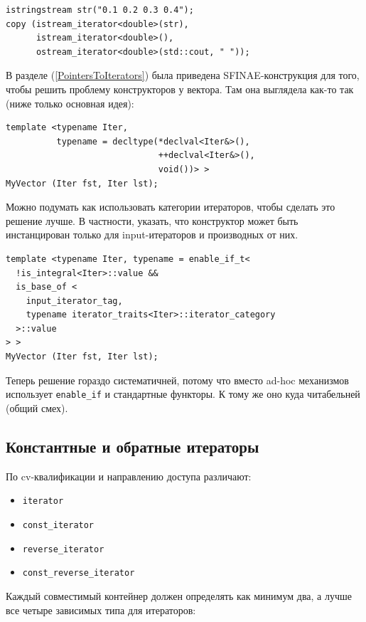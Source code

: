 \documentclass[a4paper,12pt,oneside]{book}
\begin{document}
\begin{lstlisting}
istringstream str("0.1 0.2 0.3 0.4");
copy (istream_iterator<double>(str),
      istream_iterator<double>(),
      ostream_iterator<double>(std::cout, " "));
\end{lstlisting}

В разделе (\ref{PointersToIterators}) была приведена SFINAE-конструкция для того, чтобы решить проблему конструкторов у вектора. Там она выглядела как-то так (ниже только основная идея):

\begin{lstlisting}
template <typename Iter, 
          typename = decltype(*declval<Iter&>(),
                              ++declval<Iter&>(), 
                              void())> >
MyVector (Iter fst, Iter lst);
\end{lstlisting}

Можно подумать как использовать категории итераторов, чтобы сделать это решение лучше. В частности, указать, что конструктор может быть инстанцирован только для input-итераторов и производных от них.

\begin{lstlisting}
template <typename Iter, typename = enable_if_t<
  !is_integral<Iter>::value &&
  is_base_of <
    input_iterator_tag, 
    typename iterator_traits<Iter>::iterator_category
  >::value
> >
MyVector (Iter fst, Iter lst);
\end{lstlisting}

Теперь решение гораздо систематичней, потому что вместо ad-hoc механизмов использует \lstinline!enable_if! и стандартные функторы. К тому же оно куда читабельней (общий смех).

\subsection{Константные и обратные итераторы}\label{subsub:constrev}

По cv-квалификации и направлению доступа различают:

\begin{itemize}
\item \lstinline!iterator!
\item \lstinline!const_iterator!
\item \lstinline!reverse_iterator!
\item \lstinline!const_reverse_iterator!
\end{itemize}

Каждый совместимый контейнер должен определять как минимум два, а лучше все четыре зависимых типа для итераторов:
\end{document}
